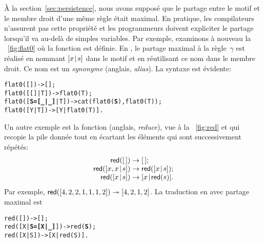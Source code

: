 À la section~\ref{sec:persistence}, nous avons supposé que le partage
entre le motif et le membre droit d'une même règle était maximal. En
pratique, les compilateurs n'assurent pas cette propriété et les
programmeurs doivent expliciter le partage lorsqu'il va au-delà de
simples variables. Par exemple, examinons à nouveau la
\fig~\vref{fig:flat0} où la fonction  est
définie. En \Erlang, le partage maximal à la règle~\(\gamma\) est
réalisé en nommant \([{x}\!\mid\!{s}]\) dans le motif et en réutilisant ce
nom dans le membre droit. Ce nom est un \emph{synonyme} (anglais,
\emph{alias}). La syntaxe est évidente:
\begin{alltt}
flat0(         []) -> [];
flat0(     [[]|T]) -> flat0(T);
flat0([\textbf{S=[\_|\_]}|T]) -> cat(flat0(\textbf{S}),flat0(T));\hfill% \emph{Synonymie}
flat0(      [Y|T]) -> [Y|flat0(T)].
\end{alltt}
  Un
autre exemple est la fonction  (anglais, \emph{reduce}),
vue à la \fig~\vref{fig:red} et qui recopie la pile donnée tout en
écartant les éléments qui sont successivement répétés:
\begin{equation*}
\begin{array}{@{}r@{\;}l@{\;}l@{}}
\fun{red}(\el)           & \rightarrow & \el;\\
\fun{red}(\cons{x,x}{s}) & \rightarrow & \fun{red}(\cons{x}{s});\\
\fun{red}(\cons{x}{s})   & \rightarrow & \cons{x}{\fun{red}(s)}.
\end{array}
\end{equation*}
Par exemple, \(\textsf{red}([4,2,2,1,1,1,2]) \twoheadrightarrow
[4,2,1,2]\). La traduction en \Erlang avec partage maximal est
\begin{alltt}
red(         []) -> [];
red([X|\textbf{S=[X|\_]}]) -> red(\textbf{S});
red(      [X|S]) -> [X|red(S)].
\end{alltt}

